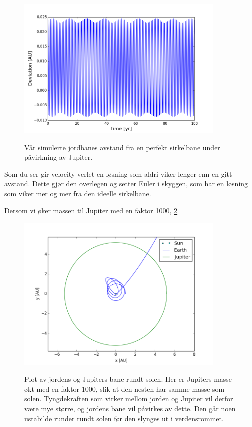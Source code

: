 \documentclass[11pt,a4paper]{article}
\begin{document}
\FloatBarrier
\begin{figure}[!ht]
\begin{center}
  \includegraphics[width = 100mm]{3e_error_dt_e-3.png}\\
  \caption{Vår simulerte jordbanes avstand fra en perfekt sirkelbane under påvirkning av Jupiter.}   \label{stabilitetJ1}
  \end{center}
  \end{figure}
\FloatBarrier
Som du ser gir velocity verlet en løsning som aldri viker lenger enn en gitt avstand. Dette gjør den overlegen og setter Euler i skyggen, som har en løsning som viker mer og mer fra den ideelle sirkelbane.

Dersom vi øker massen til Jupiter med en faktor 1000,  \ref{jupiterx1000}

\FloatBarrier
\begin{figure}[!ht]
\begin{center}
  \includegraphics[width = 100mm]{jupiterx1000.png}\\
  \caption{Plot av jordens og Jupiters bane rundt solen. Her er Jupiters masse økt med en faktor 1000, slik at den nesten har samme masse som solen. Tyngdekraften som virker mellom jorden og Jupiter vil derfor være mye større, og jordens bane vil påvirkes av dette. Den går noen ustabilde runder rundt solen før den slynges ut i verdensrommet. }   \label{jupiterx1000}
  \end{center}
  \end{figure}
\FloatBarrier
\end{document}
